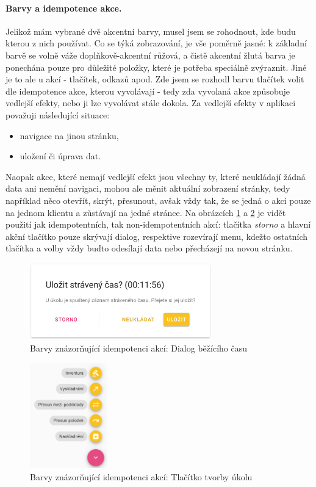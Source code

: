 \paragraph{Barvy a idempotence akce.} Jelikož mám vybrané dvě akcentní barvy, musel jsem se rohodnout, kde budu kterou z nich používat. Co se týká zobrazování, je vše poměrně jasné: k základní barvě se volně váže doplňkově-akcentní růžová, a čistě akcentní žlutá barva je ponechána pouze pro důležité položky, které je potřeba speciálně zvýraznit. Jiné je to ale u akcí - tlačítek, odkazů apod. Zde jsem se rozhodl barvu tlačítek volit dle idempotence akce, kterou vyvolávají - tedy zda vyvolaná akce způsobuje vedlejší efekty, nebo ji lze vyvolávat stále dokola. Za vedlejší efekty v aplikaci považuji následující situace:
\begin{itemize}
    \item navigace na jinou stránku,
    \item uložení či úprava dat.
\end{itemize}
Naopak akce, které nemají vedlejší efekt jsou všechny ty, které neukládají žádná data ani nemění navigaci, mohou ale měnit aktuální zobrazení stránky, tedy například něco otevřít, skrýt, přesunout, avšak vždy tak, že se jedná o akci pouze na jednom klientu a zůstávají na jedné stránce. Na obrázcích \ref{picture:colors:time_tracker} a \ref{picture:colors:task_fab} je vidět použití jak idempotentních, tak non-idempotentních akcí: tlačítka \emph{storno} a hlavní akční tlačítko pouze skrývají dialog, respektive rozevírají menu, kdežto ostatních tlačítka a volby vždy buďto odesílají data nebo přecházejí na novou stránku.

\begin{figure}[]
    \includegraphics[width=0.7\textwidth]{../png/app/colors_time_tracker.png}
    \caption{Barvy znázorňující idempotenci akcí: Dialog běžícího času} \label{picture:colors:time_tracker}
\end{figure}
\begin{figure}[]
    \includegraphics[width=0.3\textwidth]{../png/app/colors_tasks.png}
    \caption{Barvy znázorňující idempotenci akcí: Tlačítko tvorby úkolu} \label{picture:colors:task_fab}
\end{figure}

